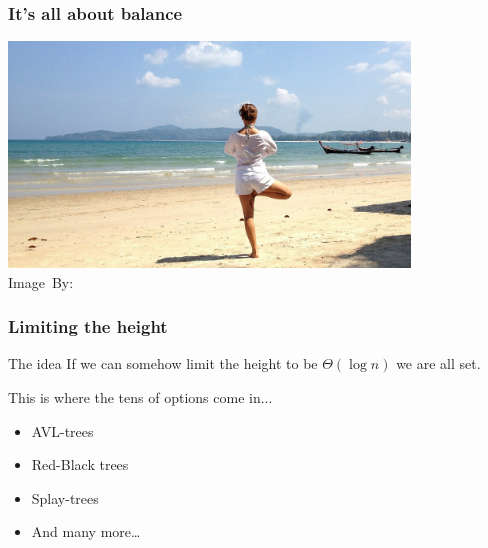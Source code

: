 \begin{frame}
	\frametitle{It's all about balance}
	\begin{center}
		\includegraphics[width=0.8\textwidth]{images/balance.jpg}\\
		\hspace*{15pt}\hbox{\scriptsize Image By:}
	\end{center}
\end{frame}

\begin{frame}
	\frametitle{Limiting the height}
	\begin{block}{The idea}
		If we can somehow limit the height to be $\Theta(\log n)$ we are all set.
	\end{block}	
	\pause
	This is where the tens of options come in...
	\begin{itemize}
		\item AVL-trees
		\item Red-Black trees
		\item Splay-trees
		\item And many more\dots
	\end{itemize}
\end{frame}


